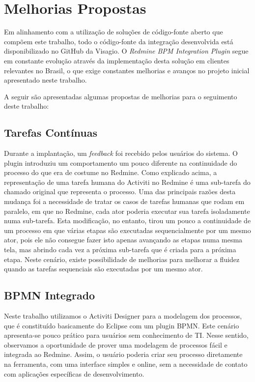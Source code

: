\section{Melhorias Propostas}\label{sec:conclusao-melhorias}

Em alinhamento com a utilização de soluções de código-fonte aberto que compõem este trabalho, todo o código-fonte da integração desenvolvida está disponibilizado no GitHub da Visagio\cite{github_visagio}. O \textit{Redmine BPM Integration Plugin} segue em constante evolução através da implementação desta solução em clientes relevantes no Brasil, o que exige constantes melhorias e avanços no projeto inicial apresentado neste trabalho.

A seguir são apresentadas algumas propostas de melhorias para o seguimento deste trabalho:

\subsection{Tarefas Contínuas}

Durante a implantação, um \textit{feedback} foi recebido pelos usuários do sistema. O plugin introduziu um comportamento um pouco diferente na continuidade do processo do que era de costume no Redmine. Como explicado acima, a representação de uma tarefa humana do Activiti no Redmine é uma sub-tarefa do chamado original que representa o processo. Uma das principais razões desta mudança foi a necessidade de tratar os casos de tarefas humanas que rodam em paralelo, em que no Redmine, cada ator poderia executar sua tarefa isoladamente numa sub-tarefa. 
Esta modificação, no entanto, tirou um pouco a continuidade de um processo em que várias etapas são executadas sequencialmente por um mesmo ator, pois ele não consegue fazer isto apenas avançando as etapas numa mesma tela, mas abrindo cada vez a próxima sub-tarefa que é criada para a próxima etapa. Neste cenário, existe possibilidade de melhorias para melhorar a fluidez quando as tarefas sequenciais são executadas por um mesmo ator.

\subsection{BPMN Integrado}

Neste trabalho utilizamos o Activiti Designer para a modelagem dos processos, que é constituído basicamente do Eclipse com um plugin BPMN. Este cenário apresenta-se pouco prático para usuários sem conhecimento de TI. Nesse sentido, observamos a oportunidade de prover uma modelagem de processos fácil e integrada ao Redmine. Assim, o usuário poderia criar seu processo diretamente na ferramenta, com uma interface simples e online, sem a necessidade de contato com aplicações específicas de desenvolvimento.


